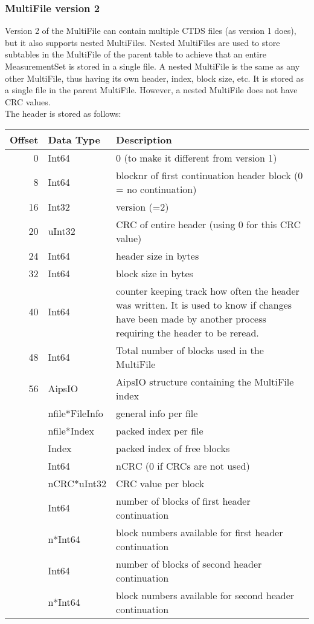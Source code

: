 \subsubsection{MultiFile version 2}
Version 2 of the MultiFile can contain multiple CTDS files (as version
1 does), but it also
supports nested MultiFiles. Nested MultiFiles are used to store
subtables in the MultiFile of the parent table to achieve that an
entire MeasurementSet is stored in a single file. A nested MultiFile is
the same as any other MultiFile, thus having its own header, index,
block size, etc.  It is stored as a single file in the parent MultiFile.
However, a nested MultiFile does not have CRC values.
\\The header is stored as follows:

\vspace{0.15in}
\begin{tabular}{|r|l|p{12cm}|} \hline
  Offset & Data Type & Description \\ \hline\hline
  0 & Int64 & 0  (to make it different from version 1) \\
  8 & Int64 & blocknr of first continuation header block (0 = no continuation) \\
  16 & Int32 & version (=2) \\
  20 & uInt32 & CRC of entire header (using 0 for this CRC value) \\
  24 & Int64 & header size in bytes \\
  32 & Int64 & block size in bytes \\
  40 & Int64 & counter keeping track how often the header was written. It
          is used to know if changes have been made by another process
          requiring the header to be reread. \\
  48 & Int64 & Total number of blocks used in the MultiFile \\
  56 & AipsIO & AipsIO structure containing the MultiFile index \\
       & nfile*FileInfo & general info per file \\
       & nfile*Index & packed index per file \\
       & Index & packed index of free blocks \\
       & Int64 & nCRC (0 if CRCs are not used) \\
       & nCRC*uInt32 & CRC value per block \\
       & Int64 & number of blocks of first header continuation \\
       & n*Int64 & block numbers available for first header continuation \\
       & Int64 & number of blocks of second header continuation \\
       & n*Int64 & block numbers available for second header continuation \\
  \hline
\end{tabular}
\vspace{0.15in}

